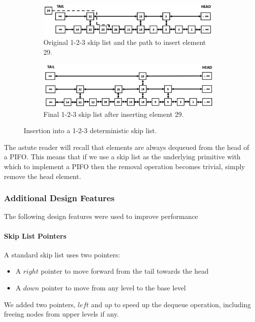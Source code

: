 \begin{figure}[t!] %
\centering
\begin{subfigure}{\linewidth}
\centering
\includegraphics[width=0.8\linewidth]{figures/design/skip-list-a}
\caption{Original 1-2-3 skip list and the path to insert element 29.} \label{fig:skip-list-a}
\end{subfigure}\hspace*{\fill}

\medskip
\begin{subfigure}{\linewidth}
\centering
\includegraphics[width=0.8\linewidth]{figures/design/skip-list-b}
\caption{Final 1-2-3 skip list after inserting element 29.} \label{fig:skip-list-b}
\end{subfigure}\hspace*{\fill}

\caption{Insertion into a 1-2-3 deterministic skip list.}\label{fig:skip-list}
\vspace{-1.0em}
\end{figure}

The astute reader will recall that elements are always dequeued from the head of a PIFO. This means that if we use a skip list as the underlying primitive with which to implement a PIFO then the removal operation becomes trivial, simply remove the head element.  %

\subsubsection{Additional Design Features}\label{sec:add-features}
The following design features were used to improve performance
\paragraph{Skip List Pointers}
A standard skip list uses two pointers:
\begin{itemize}
\item A $right$ pointer to move forward from the tail towards the head
\item A $down$ pointer to move from any level to the base level
\end{itemize}
We added two pointers, $left$ and $up$ to speed up the dequeue operation, including freeing nodes from upper levels if any.

